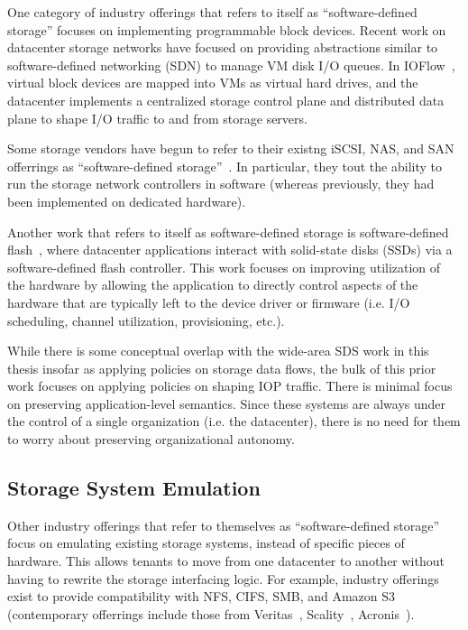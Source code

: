 One category of industry offerings that refers to itself as ``software-defined
storage'' focuses on implementing programmable block devices.
Recent work on datacenter storage networks have focused on providing
abstractions similar to software-defined networking (SDN) to manage VM disk I/O queues.  In
IOFlow~\cite{ioflow}, virtual block devices
are mapped into VMs as virtual hard drives, and the datacenter implements a
centralized storage control plane and distributed data plane to shape I/O traffic to and
from storage servers.

Some storage vendors have begun to refer to their existng iSCSI, NAS, and SAN offerrings as
``software-defined storage''~\cite{computerweekly-storagebuzz}.  In particular,
they tout the ability to run the storage network controllers in
software (whereas previously, they had been implemented on dedicated hardware).

Another work that refers to itself as software-defined storage
is software-defined flash~\cite{sdf-baidu}, where
datacenter applications interact with solid-state disks (SSDs) via a
software-defined flash controller.  This work focuses on improving utilization
of the hardware by allowing the application to directly control aspects of the
hardware that are typically left to the device driver or firmware (i.e. I/O scheduling,
channel utilization, provisioning, etc.).

While there is some conceptual overlap with the wide-area SDS work in this
thesis insofar as applying policies on storage data flows,
the bulk of this prior work focuses on applying policies on shaping IOP traffic.  There
is minimal focus on preserving application-level semantics.  Since these systems are
always under the control of a single organization (i.e. the datacenter), there
is no need for them to worry about preserving organizational autonomy.

\subsection{Storage System Emulation}

Other industry offerings that refer to themselves as ``software-defined storage''
focus on emulating existing storage systems, instead of specific pieces of
hardware.  This allows tenants to move from one datacenter to another without having to
rewrite the storage interfacing logic.  For example, industry offerings exist to
provide compatibility with NFS, CIFS, SMB, and Amazon S3 (contemporary
offerrings include those from
Veritas~\cite{veritas}, Scality~\cite{scality}, Acronis~\cite{acronis}).

